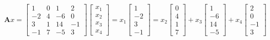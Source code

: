 \documentclass[english,onecolumn]{IEEEtran}
\begin{document}
\begin{enumerate}
$\mathbf{A}x = 
\left[\begin{array}{llll}
    	1 & 0 & 1 & 2\\
	-2 & 4 & -6 & 0\\
    	3 & 1 & 14 & -1\\
	 -1 & 7 & -5 &3 
\end{array}\right]
\left[\begin{array}{c}
x_1\\
x_2\\
x_3\\
x_4 
\end{array}\right]=
x_1\left[\begin{array}{c}
	1\\
	-2\\
	3\\
	-1 
\end{array}\right]=
x_2\left[\begin{array}{c}
	0\\
	4\\
	1\\
	7 
\end{array}\right]+
x_3\left[\begin{array}{c}
	1\\
	-6\\
	14\\
	-5 
\end{array}\right]+
x_4\left[\begin{array}{c}
	2\\
	0\\
	-1\\
	3 
\end{array}\right]
$


\end{enumerate}
\end{document}
